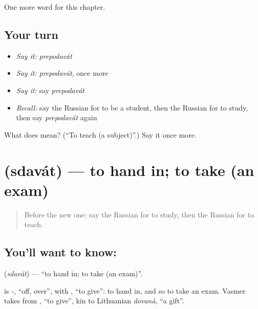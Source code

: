 \begin{grammarlens}[title={What you've built}]
One more word for this chapter.
\end{grammarlens}

\subsection*{Your turn}
\begin{itemize}
\raggedright
  \item \emph{Say it:} \emph{prepodavát}
  \item \emph{Say it:} \emph{prepodavát}, once more
  \item \emph{Say it:} say \emph{prepodavát}
  \item \emph{Recall:} say the Russian for to be a student, then the Russian for to study, then say \emph{prepodavát} again
\end{itemize}

\begin{tcolorbox}[breakable,colback=teal!4,colframe=teal!35!black,title={Before you move on}]
What does  mean? (\textquotedblleft{}To teach (a subject)\textquotedblright{}.) Say it once more.
\end{tcolorbox}
\section[\texorpdfstring{\ru{сдавать} (sdavát)}{сдавать (sdavát)}]{ (sdavát) — to hand in; to take (an exam)}

\label{lesson:RU-C205-sdavat}



\begin{quote}
Before the new one: say the Russian for to study, then the Russian for to teach.
\end{quote}

\subsection*{You'll want to know: }
\textbf{} (\emph{sdavát}) — \textquotedblleft{}to hand in; to take (an exam)\textquotedblright{}.

\begin{cousinweb}
\textbf{} is \emph{-}, \textquotedblleft{}off, over\textquotedblright{}, with \emph{}, \textquotedblleft{}to give\textquotedblright{}: to hand in, and so to take an exam. Vasmer takes \emph{} from \emph{}, \textquotedblleft{}to give\textquotedblright{}, kin to Lithuanian \emph{dovanà}, \textquotedblleft{}a gift\textquotedblright{}.
\end{cousinweb}


